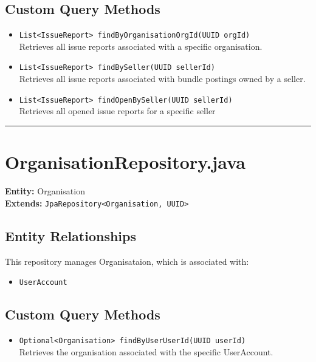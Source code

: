 \documentclass[12pt]{article}
\begin{document}
\subsection*{Custom Query Methods}
\begin{itemize}
    \item \texttt{List<IssueReport> findByOrganisationOrgId(UUID orgId)} \\
    Retrieves all issue reports associated with a specific organisation.



    
    \item \texttt{List<IssueReport> findBySeller(UUID sellerId)} \\
    Retrieves all issue reports associated with bundle postings owned by a seller.

    \item \texttt{List<IssueReport> findOpenBySeller(UUID sellerId)} \\
     Retrieves all opened issue reports for a specific seller


    
\end{itemize}

\hrule
\vspace{1em}

\section{OrganisationRepository.java}

\textbf{Entity:} Organisation \\
\textbf{Extends:} \texttt{JpaRepository<Organisation, UUID>}

\subsection*{Entity Relationships}

This repository manages Organisataion, which is associated with:

\begin{itemize}
    \item \texttt{UserAccount}
\end{itemize}


\subsection*{Custom Query Methods}
\begin{itemize}
    \item \texttt{Optional<Organisation> findByUserUserId(UUID userId)} \\ 
  Retrieves the organisation associated with the specific UserAccount.

\end{itemize}
\end{document}

